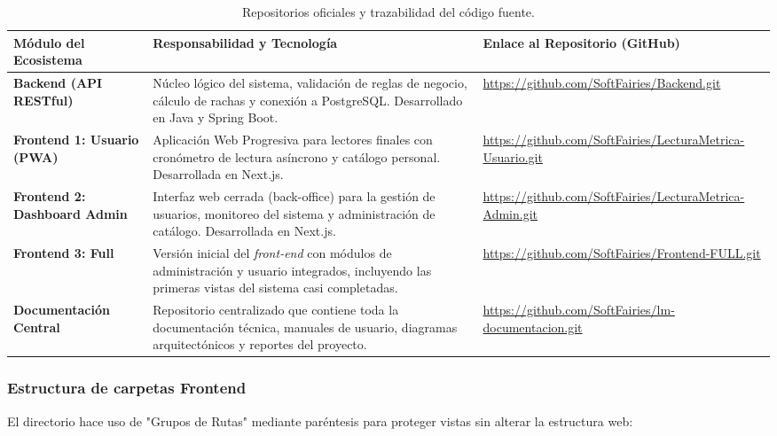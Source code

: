 \documentclass[12pt, atypical, journal]{article}
\begin{document}
\begin{table}[H]
\centering
\footnotesize
\begin{tabular}{|p{3.8cm}|p{6.2cm}|p{4.5cm}|}
\hline
\textbf{Módulo del Ecosistema} & \textbf{Responsabilidad y Tecnología} & \textbf{Enlace al Repositorio (GitHub)} \\ \hline
\textbf{Backend (API RESTful)} & Núcleo lógico del sistema, validación de reglas de negocio, cálculo de rachas y conexión a PostgreSQL. Desarrollado en Java y Spring Boot. & \url{https://github.com/SoftFairies/Backend.git} \\ \hline
\textbf{Frontend 1: Usuario (PWA)} & Aplicación Web Progresiva para lectores finales con cronómetro de lectura asíncrono y catálogo personal. Desarrollada en Next.js. & \url{https://github.com/SoftFairies/LecturaMetrica-Usuario.git} \\ \hline
\textbf{Frontend 2: Dashboard Admin} & Interfaz web cerrada (back-office) para la gestión de usuarios, monitoreo del sistema y administración de catálogo. Desarrollada en Next.js. & \url{https://github.com/SoftFairies/LecturaMetrica-Admin.git} \\ \hline
\textbf{Frontend 3: Full} & Versión inicial del \textit{front-end} con módulos de administración y usuario integrados, incluyendo las primeras vistas del sistema casi completadas. & \url{https://github.com/SoftFairies/Frontend-FULL.git} \\ \hline
\textbf{Documentación Central} & Repositorio centralizado que contiene toda la documentación técnica, manuales de usuario, diagramas arquitectónicos y reportes del proyecto. & \url{https://github.com/SoftFairies/lm-documentacion.git} \\ \hline

\end{tabular}
\caption{Repositorios oficiales y trazabilidad del código fuente.}
\label{tab:repositorios_github}
\end{table}

\subsubsection{Estructura de carpetas Frontend}
El directorio  hace uso de "Grupos de Rutas" mediante paréntesis para proteger vistas sin alterar la estructura web:
\end{document}
